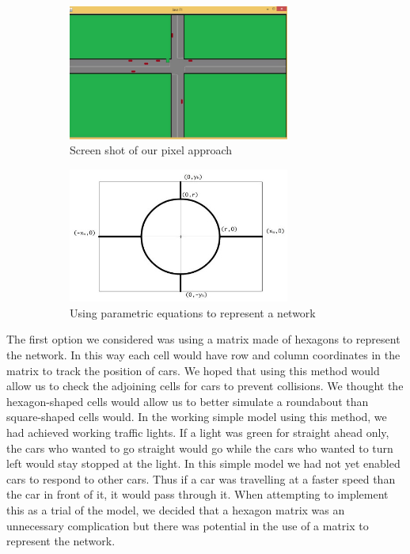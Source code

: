 \documentclass{article}
\begin{document}
\begin{figure}
	\centering
	\begin{subfigure}{4cm}
		\centering
		\includegraphics[width=0.8\textwidth]{ScreenShotNurSim}
		\caption{Screen shot of our pixel approach}
		\label{NursModel}
	\end{subfigure}
	\begin{subfigure}{4cm }
		\centering
		\includegraphics[width=0.8\textwidth]{KimsModel}
		\caption{Using parametric equations to represent a network}
		\label{KimModel}
	\end{subfigure}
    \caption{}
\end{figure}
	
	The first option we considered was using a matrix made of hexagons to represent the network. In this way each cell would have row and column coordinates in the matrix to track the position of cars. We hoped that using this method would allow us to check the adjoining cells for cars to prevent collisions. We thought the hexagon-shaped cells would allow us to better simulate a roundabout than square-shaped cells would. In the working simple model using this method, we had achieved working traffic lights. If a light was green for straight ahead only, the cars who wanted to go straight would go while the cars who wanted to turn left would stay stopped at the light. In this simple model we had not yet enabled cars to respond to other cars. Thus if a car was travelling at a faster speed than the car in front of it, it would pass through it. When attempting to implement this as a trial of the model, we decided that a hexagon matrix was an unnecessary complication but there was potential in the use of a matrix to represent the network. 
	
\end{document}
